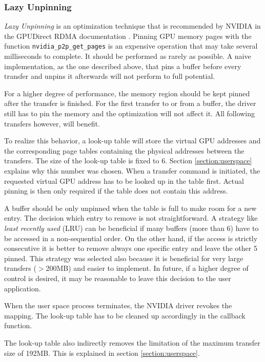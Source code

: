\subsubsection*{Lazy Unpinning}
\label{section:lazy}

\emph{Lazy Unpinning} is an optimization technique that is recommended by NVIDIA in the GPUDirect RDMA documentation \cite{rdma}.
Pinning GPU memory pages with the function \texttt{nvidia\_p2p\_get\_pages} is an expensive operation that may take several milliseconds to complete.
It should be performed as rarely as possible.
A naive implementation, as the one described above, that pins a buffer before every transfer and unpins it afterwards will not perform to full potential.

For a higher degree of performance, the memory region should be kept pinned after the transfer is finished.
For the first transfer to or from a buffer, the driver still has to pin the memory and the optimization will not affect it.
All following transfers however, will benefit.

To realize this behavior, a look-up table will store the virtual GPU addresses and the corresponding page tables containing the physical addresses between the transfers.
The size of the look-up table is fixed to 6.
Section \ref{section:userspace} explains why this number was chosen.
When a transfer command is initiated, the requested virtual GPU address has to be looked up in the table first.
Actual pinning is then only required if the table does not contain this address.

A buffer should be only unpinned when the table is full to make room for a new entry.
The decision which entry to remove is not straightforward.
A strategy like \emph{least recently used} (LRU) can be beneficial if many buffers (more than 6) have to be accessed in a non-sequential order.
On the other hand, if the access is strictly consecutive it is better to remove always one specific entry and leave the other 5 pinned.
This strategy was selected also because it is beneficial for very large transfers ($>$200MB) and easier to implement.
In future, if a higher degree of control is desired, it may be reasonable to leave this decision to the user application.


When the user space process terminates, the NVIDIA driver revokes the mapping. The look-up table has to be cleaned up accordingly in the callback function.

The look-up table also indirectly removes the limitation of the maximum transfer size of 192MB.
This is explained in section \ref{section:userspace}.








